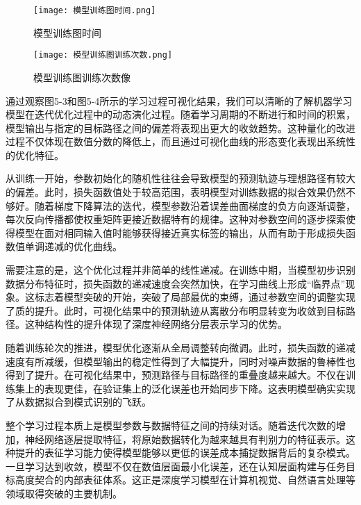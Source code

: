 \begin{figure}[hbt]
	\centering
	\texttt{[image: 模型训练图时间.png]}
	\caption{模型训练图时间}
	\label{f.example}
\end{figure}


\begin{figure}[hbt]
	\centering
	\texttt{[image: 模型训练图训练次数.png]}
	\caption{模型训练图训练次数像}
	\label{f.example}
\end{figure}

通过观察图5-3和图5-4所示的学习过程可视化结果，我们可以清晰的了解机器学习模型在迭代优化过程中的动态演化过程。随着学习周期的不断进行和时间的积累，模型输出与指定的目标路径之间的偏差将表现出更大的收敛趋势。这种量化的改进过程不仅体现在数值分数的降低上，而且通过可视化曲线的形态变化表现出系统性的优化特征。

从训练一开始，参数初始化的随机性往往会导致模型的预测轨迹与理想路径有较大的偏差。此时，损失函数值处于较高范围，表明模型对训练数据的拟合效果仍然不够好。随着梯度下降算法的迭代，模型参数沿着误差曲面梯度的负方向逐渐调整，每次反向传播都使权重矩阵更接近数据特有的规律。这种对参数空间的逐步探索使得模型在面对相同输入值时能够获得接近真实标签的输出，从而有助于形成损失函数值单调递减的优化曲线。


需要注意的是，这个优化过程并非简单的线性递减。在训练中期，当模型初步识别数据分布特征时，损失函数的递减速度会突然加快，在学习曲线上形成“临界点”现象。这标志着模型突破的开始，突破了局部最优的束缚，通过参数空间的调整实现了质的提升。此时，可视化结果中的预测轨迹从离散分布明显转变为收敛到目标路径。这种结构性的提升体现了深度神经网络分层表示学习的优势。

随着训练轮次的推进，模型优化逐渐从全局调整转向微调。此时，损失函数的递减速度有所减缓，但模型输出的稳定性得到了大幅提升，同时对噪声数据的鲁棒性也得到了提升。在可视化结果中，预测路径与目标路径的重叠度越来越大。不仅在训练集上的表现更佳，在验证集上的泛化误差也开始同步下降。这表明模型确实实现了从数据拟合到模式识别的飞跃。

整个学习过程本质上是模型参数与数据特征之间的持续对话。随着迭代次数的增加，神经网络逐层提取特征，将原始数据转化为越来越具有判别力的特征表示。这种提升的表征学习能力使得模型能够以更低的误差成本捕捉数据背后的复杂模式。一旦学习达到收敛，模型不仅在数值层面最小化误差，还在认知层面构建与任务目标高度契合的内部表征体系。这正是深度学习模型在计算机视觉、自然语言处理等领域取得突破的主要机制。








